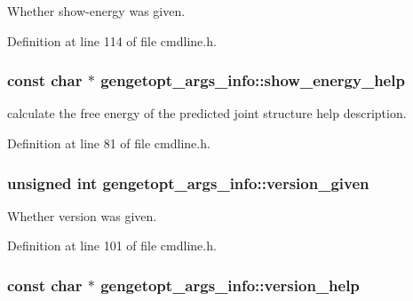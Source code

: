 Whether show-\/energy was given. 



Definition at line 114 of file cmdline.\+h.

\hypertarget{structgengetopt__args__info_a2deb60524353a2560c25fd0883cd225f}{
\subsubsection[{show\+\_\+energy\+\_\+help}]{\setlength{\rightskip}{0pt plus 5cm}const char $\ast$ gengetopt\+\_\+args\+\_\+info\+::show\+\_\+energy\+\_\+help}}\label{structgengetopt__args__info_a2deb60524353a2560c25fd0883cd225f}


calculate the free energy of the predicted joint structure help description. 



Definition at line 81 of file cmdline.\+h.

\hypertarget{structgengetopt__args__info_ad4953a2130b2f8b94a3a687014f278e1}{
\subsubsection[{version\+\_\+given}]{\setlength{\rightskip}{0pt plus 5cm}unsigned int gengetopt\+\_\+args\+\_\+info\+::version\+\_\+given}}\label{structgengetopt__args__info_ad4953a2130b2f8b94a3a687014f278e1}


Whether version was given. 



Definition at line 101 of file cmdline.\+h.

\hypertarget{structgengetopt__args__info_adb4fc9ee66c499d4225d6f6eefbd8c09}{
\subsubsection[{version\+\_\+help}]{\setlength{\rightskip}{0pt plus 5cm}const char $\ast$ gengetopt\+\_\+args\+\_\+info\+::version\+\_\+help}}\label{structgengetopt__args__info_adb4fc9ee66c499d4225d6f6eefbd8c09}


